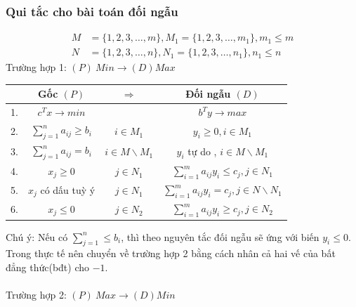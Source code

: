 \documentclass{article}
\begin{document}
\subsubsection{Qui tắc cho bài toán đối ngẫu }
\begin{equation*}
    \begin{split}
        M &= \{1,2,3, \ldots , m\} , M_1 = \{ 1,2,3, \ldots , m_1 \} , m_1 \leq m \\
        N &= \{ 1,2,3, \ldots , n\} , N_1 = \{ 1,2,3, \ldots , n_1\} , n_1 \leq n
    \end{split}
\end{equation*}
Trường hợp 1: $(P) \: Min \rightarrow (D) Max$ \\
\begin{center}
    \begin{tabular}{|c|c|c|c|}
        \hline
        & Gốc $(P)$ & $\Rightarrow$& Đối ngẫu $(D)$ \\
        \hline
        1. & $c^Tx \rightarrow min$ && $b^Ty \rightarrow max$ \\
        \hline
        2. &  $\sum_{j=1}^n a_{ij} \geq b_i$ & $i \in M_1$ & $y_i \geq  0 , i \in M_1$ \\
        \hline
        3. & $\sum_{j=1}^n a_{ij} = b_i$ & $i \in M \backslash M_1$ & $y_i$ tự do , $i \in M\backslash M_1$ \\
        \hline
        4. & $x_j \geq 0$ & $j \in N_1$ & $\sum_{i=1}^m a_{ij}y_i \leq c_j , j \in N_1$ \\
        \hline
        5. & $x_j$ có dấu tuỳ ý & $j \in N_1$ & $\sum_{i=1}^m a_{ij} y_i = c_j , j \in N\backslash N_1$ \\
        \hline
        6. & $x_j \leq 0$ & $j \in N_2$ & $\sum_{i=1}^m a_{ij}y_i \geq c_j , j \in N_2$ \\
        \hline
    \end{tabular}
\end{center}
Chú ý: Nếu có $\sum_{j=1}^n \leq b_i$, thì theo nguyên 
tắc đối ngẫu sẽ ứng với biến $y_i \leq 0$. 
Trong thực tế nên chuyển về trường hợp 2 bằng cách
 nhân cả hai vế của bất đẳng thức(bđt) cho $-1$. \\
\vspace{20pt}
\\            
Trường hợp 2: $(P) \: Max \rightarrow (D) Min$ \\
\end{document}
